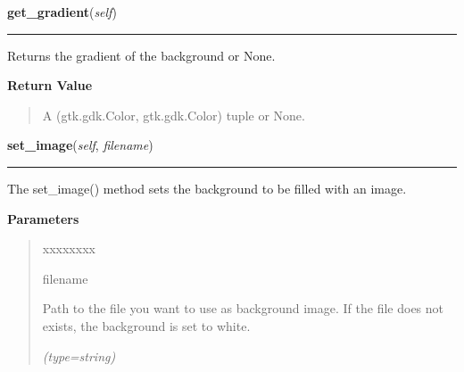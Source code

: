 \hspace{.8\funcindent}\begin{boxedminipage}{\funcwidth}

    \raggedright \textbf{get\_gradient}(\textit{self})

    \vspace{-1.5ex}

    \rule{\textwidth}{0.5\fboxrule}
\setlength{\parskip}{2ex}
    Returns the gradient of the background or None.

\setlength{\parskip}{1ex}
      \textbf{Return Value}
    \vspace{-1ex}

      \begin{quote}
      A (gtk.gdk.Color, gtk.gdk.Color) tuple or None.

      \end{quote}

    \end{boxedminipage}

    \label{pygtk_chart:chart:Background:set_image}

    \vspace{0.5ex}

\hspace{.8\funcindent}\begin{boxedminipage}{\funcwidth}

    \raggedright \textbf{set\_image}(\textit{self}, \textit{filename})

    \vspace{-1.5ex}

    \rule{\textwidth}{0.5\fboxrule}
\setlength{\parskip}{2ex}
    The set\_image() method sets the background to be filled with an image.

\setlength{\parskip}{1ex}
      \textbf{Parameters}
      \vspace{-1ex}

      \begin{quote}
        \begin{Ventry}{xxxxxxxx}

          \item[filename]

          Path to the file you want to use as background image. If the file
          does not exists, the background is set to white.

            {\it (type=string)}

        \end{Ventry}

      \end{quote}

    \end{boxedminipage}

